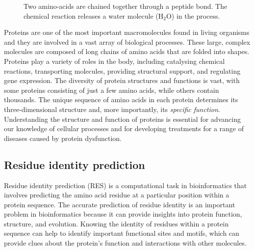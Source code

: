\begin{figure}
    \centering
    \caption{Two amino-acids are chained together through a peptide bond. The chemical reaction releases a water molecule ($\text{H}_2\text{O}$) in the process.}
    \label{fig:residue}
\end{figure}
Proteins are one of the most important macromolecules found in living organisms and they are involved in a vast array of biological processes. 
These large, complex molecules are composed of long chains of amino acids that are folded into shapes.
Proteins play a variety of roles in the body, including catalysing chemical reactions, transporting molecules, providing structural support, and regulating gene expression. 
The diversity of protein structures and functions is vast, with some proteins consisting of just a few amino acids, while others contain thousands. 
The unique sequence of amino acids in each protein determines its three-dimensional structure and, more importantly, its \textit{specific function}. 
Understanding the structure and function of proteins is essential for advancing our knowledge of cellular processes and for developing treatments for a range of diseases caused by protein dysfunction.
\subsection{Residue identity prediction}
Residue identity prediction (RES) is a computational task in bioinformatics that involves predicting the amino acid residue at a particular position within a protein sequence. 
The accurate prediction of residue identity is an important problem in bioinformatics because it can provide insights into protein function, structure, and evolution. 
Knowing the identity of residues within a protein sequence can help to identify important functional sites and motifs, which can provide clues about the protein's function and interactions with other molecules. 

